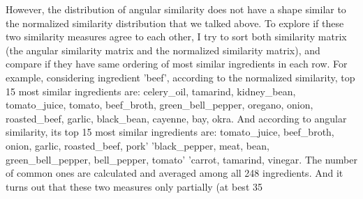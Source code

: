 \documentclass[12pt]{report}
\begin{document}
\begin{multicols}{2}
However, the distribution of angular similarity does not have a shape similar to the normalized similarity distribution that we talked above. To explore if these two similarity measures agree to each other, I try to sort both similarity matrix (the angular similarity matrix and the normalized similarity matrix), and compare if they have same ordering of most similar ingredients in each row. 
For example, considering ingredient 'beef', according to the normalized similarity, top 15 most similar ingredients are: celery\_oil, tamarind, kidney\_bean, tomato\_juice, tomato, beef\_broth, green\_bell\_pepper, oregano, onion, roasted\_beef, garlic, black\_bean, cayenne, bay, okra. And according to angular similarity, its top 15 most similar ingredients are: tomato\_juice, beef\_broth, onion, garlic, roasted\_beef, pork'
 'black\_pepper, meat, bean, green\_bell\_pepper, bell\_pepper, tomato'
 'carrot, tamarind, vinegar. The number of common ones are calculated and averaged among all 248 ingredients. And it turns out that these two measures only partially (at best 35%


\end{multicols}
\end{document}
